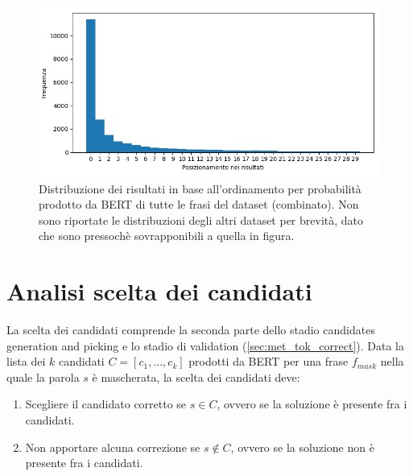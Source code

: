 \begin{figure}[H]
\centering
\includegraphics[width=\textwidth]{immagini/analisi/score_order_Combinato}
\caption{Distribuzione dei risultati in base all'ordinamento per probabilità prodotto da BERT di tutte le frasi del dataset (combinato). Non sono riportate le distribuzioni degli altri dataset per brevità, dato che sono pressochè sovrapponibili a quella in figura.}
\label{fig:ana_scoreorder}
\end{figure}



\section{Analisi scelta dei candidati}
\label{sec:ana_cor}

La scelta dei candidati comprende la seconda parte dello stadio candidates generation and picking e lo stadio di validation (\autoref{sec:met_tok_correct}). Data la lista dei $k$ candidati $C = [c_1,...,c_k]$ prodotti da BERT per una frase $f_{mask}$ nella quale la parola $s$ è mascherata, la scelta dei candidati deve:

\begin{enumerate}
\item Scegliere il candidato corretto se $s \in C$, ovvero se la soluzione è presente fra i candidati.

\item Non apportare alcuna correzione se $s \not\in C$, ovvero se la soluzione non è presente fra i candidati.
\end{enumerate}



